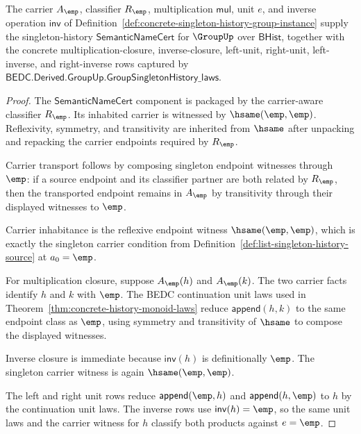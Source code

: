 \begin{theorem}
\label{thm:group-singleton-history-semantic-namecert}
The carrier $A_{\emp}$, classifier $R_{\emp}$, multiplication
$\mathsf{mul}$, unit $e$, and inverse operation $\mathsf{inv}$ of
Definition~\ref{def:concrete-singleton-history-group-instance} supply the
singleton-history $\mathsf{SemanticNameCert}$ for $\GroupUp$ over
$\mathsf{BHist}$, together with the concrete multiplication-closure,
inverse-closure, left-unit, right-unit, left-inverse, and right-inverse rows
captured by $\mathsf{BEDC.Derived.GroupUp.GroupSingletonHistory\_laws}$.
\end{theorem}
\begin{proof}
The $\mathsf{SemanticNameCert}$ component is packaged by the carrier-aware
classifier $R_{\emp}$. Its inhabited carrier is witnessed by
$\hsame(\emp,\emp)$. Reflexivity, symmetry, and transitivity are inherited
from $\hsame$ after unpacking and repacking the carrier endpoints required by
$R_{\emp}$.

Carrier transport follows by composing singleton endpoint witnesses through
$\emp$: if a source endpoint and its classifier partner are both related by
$R_{\emp}$, then the transported endpoint remains in $A_{\emp}$ by
transitivity through their displayed witnesses to $\emp$.

Carrier inhabitance is the reflexive endpoint witness
$\hsame(\emp,\emp)$, which is exactly the singleton carrier condition from
Definition~\ref{def:list-singleton-history-source} at $a_0=\emp$.

For multiplication closure, suppose $A_{\emp}(h)$ and $A_{\emp}(k)$. The two
carrier facts identify $h$ and $k$ with $\emp$. The BEDC continuation unit
laws used in Theorem~\ref{thm:concrete-history-monoid-laws} reduce
$\mathsf{append}(h,k)$ to the same endpoint class as $\emp$, using symmetry
and transitivity of $\hsame$ to compose the displayed witnesses.

Inverse closure is immediate because $\mathsf{inv}(h)$ is definitionally
$\emp$. The singleton carrier witness is again $\hsame(\emp,\emp)$.

The left and right unit rows reduce $\mathsf{append}(\emp,h)$ and
$\mathsf{append}(h,\emp)$ to $h$ by the continuation unit laws. The inverse
rows use $\mathsf{inv}(h)=\emp$, so the same unit laws and the carrier witness
for $h$ classify both products against $e=\emp$.
\end{proof}


